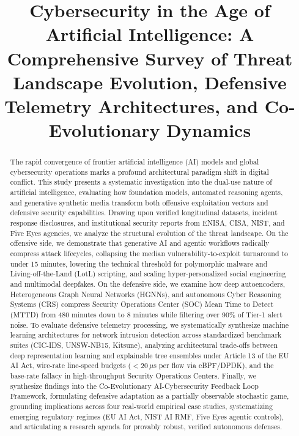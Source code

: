 \documentclass[conference,10pt,twocolumn,a4paper]{IEEEtran}
\begin{document}
\title{Cybersecurity in the Age of Artificial Intelligence: A Comprehensive Survey of Threat Landscape Evolution, Defensive Telemetry Architectures, and Co-Evolutionary Dynamics}

\author{
}

\maketitle

\begin{abstract}
The rapid convergence of frontier artificial intelligence (AI) models and global cybersecurity operations marks a profound architectural paradigm shift in digital conflict. This study presents a systematic investigation into the dual-use nature of artificial intelligence, evaluating how foundation models, automated reasoning agents, and generative synthetic media transform both offensive exploitation vectors and defensive security capabilities. Drawing upon verified longitudinal datasets, incident response disclosures, and institutional security reports from ENISA, CISA, NIST, and Five Eyes agencies, we analyze the structural evolution of the threat landscape. On the offensive side, we demonstrate that generative AI and agentic workflows radically compress attack lifecycles, collapsing the median vulnerability-to-exploit turnaround to under 15 minutes, lowering the technical threshold for polymorphic malware and Living-off-the-Land (LotL) scripting, and scaling hyper-personalized social engineering and multimodal deepfakes. On the defensive side, we examine how deep autoencoders, Heterogeneous Graph Neural Networks (HGNNs), and autonomous Cyber Reasoning Systems (CRS) compress Security Operations Center (SOC) Mean Time to Detect (MTTD) from 480 minutes down to 8 minutes while filtering over 90\% of Tier-1 alert noise. To evaluate defensive telemetry processing, we systematically synthesize machine learning architectures for network intrusion detection across standardized benchmark suites (CIC-IDS, UNSW-NB15, Kitsune), analyzing architectural trade-offs between deep representation learning and explainable tree ensembles under Article 13 of the EU AI Act, wire-rate line-speed budgets ($<$20\,$\mu$s per flow via eBPF/DPDK), and the base-rate fallacy in high-throughput Security Operations Centers. Finally, we synthesize findings into the Co-Evolutionary AI-Cybersecurity Feedback Loop Framework, formulating defensive adaptation as a partially observable stochastic game, grounding implications across four real-world empirical case studies, systematizing emerging regulatory regimes (EU AI Act, NIST AI RMF, Five Eyes agentic controls), and articulating a research agenda for provably robust, verified autonomous defenses.
\end{abstract}
\end{document}
